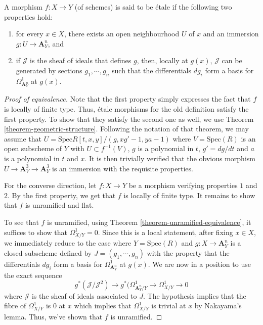 \begin{definition}
\label{definition-etale-differential}
A morphism $f:X \to Y$ (of schemes) is said to be \'etale if the following
two properties hold:
\begin{enumerate}
\item for every $x \in X$, there exists an open neighbourhood $U$ of $x$ and an immersion $g:U \to \mathbf{A}^n_Y$, and
\item if $\mathcal{J}$ is the sheaf of ideals that defines $g$, then, locally at
$g(x)$, $\mathcal{J}$ can be generated by sections $g_1,\cdots,g_n$ such that the
differentials $dg_i$ form a basis for $\Omega^1_{\mathbf{A}^n_Y}$ at $g(x)$.  
\end{enumerate}
\end{definition}

\begin{proof}[Proof of equivalence]
Note that the first property simply expresses the fact that $f$ is locally of
finite type. Thus, \'etale morphisms for the old definition satisfy the first
property. To show that they satisfy the second one as well, we use Theorem
\ref{theorem-geometric-structure}. Following the notation of that theorem,
we may assume that $U = \text{Spec}  R[t,x,y]/(g,xg' - 1, ya - 1)$ where
$V = \text{Spec}(R)$ is an open subscheme of $Y$ with $U \subset f^{-1}(V)$, $g$
is a polynomial in $t$, $g' = dg/dt$ and $a$ is a polynomial in $t$ and $x$.
It is then trivially verified that the obvious morphism
$U \to \mathbf{A}^3_V \to \mathbf{A}^3_Y$ is an immersion with the requisite properties.

\smallskip\noindent
For the converse direction, let $f:X \to Y$ be a morphism verifying properties
$1$ and $2$. By the first property, we get that $f$ is locally of finite type.
It remains to show that $f$ is unramified and flat.

\smallskip\noindent
To see that $f$ is unramified, using Theorem
\ref{theorem-unramified-equivalence}, it suffices to show that
$\Omega^1_{X/Y} = 0$. Since this is a local statement, after fixing $x \in X$,
we immediately reduce to the case where $Y = \text{Spec}(R)$ and $g:X \to \mathbf{A}^n_Y$ is
a closed subscheme defined by $J = (g_1,\cdots,g_n)$ with the property that
the differentials $dg_i$ form a basis for $\Omega^1_{\mathbf{A}^n_Y}$ at $g(x)$. We
are now in a position to use the exact sequence 
$$
g^*(\mathcal{J}/\mathcal{J}^2) \to g^*(\Omega^1_{\mathbf{A}^n_Y/Y} \to \Omega^1_{X/Y} \to 0
$$
where $\mathcal{J}$ is the sheaf of ideals associated to $J$. The hypothesis implies
that the fibre of $\Omega^1_{X/Y}$ is $0$ at $x$ which implies that
$\Omega^1_{X/Y}$ is trivial at $x$ by Nakayama's lemma. Thus, we've shown
that $f$ is unramified.


\end{proof}
